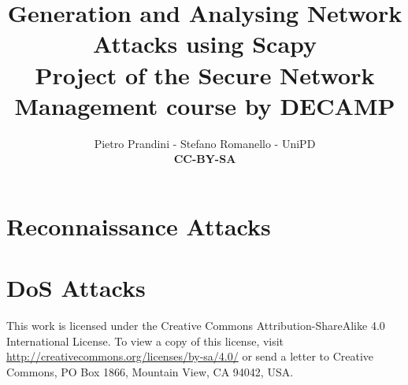\documentclass[10pt,a4paper]{article}
\author{Pietro Prandini - Stefano Romanello - UniPD\\{\textbf{\tiny{CC-BY-SA}}}}
\title{Generation and Analysing Network Attacks using Scapy\\{\small{Project of the Secure Network Management course by DECAMP}}}
\begin{document}
\maketitle %

\section{Reconnaissance Attacks}



\section{DoS Attacks}

\vspace*{\fill}
\centering
\tiny{This work is licensed under the Creative Commons Attribution-ShareAlike 4.0 International License. To view a copy of this license, visit \href{http://creativecommons.org/licenses/by-sa/4.0/}{http://creativecommons.org/licenses/by-sa/4.0/} or send a letter to Creative Commons, PO Box 1866, Mountain View, CA 94042, USA.}
\end{document}
